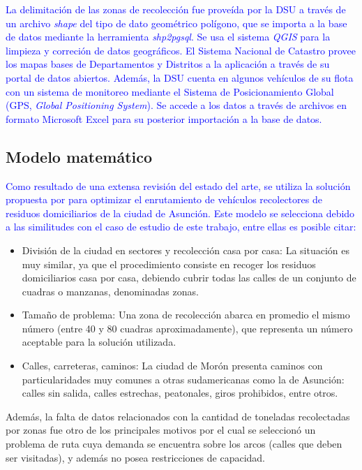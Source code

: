 \documentclass[spanish, conference]{IEEEtran}
\begin{document}
{\textcolor{blue}{La delimitación de las zonas de recolección fue proveída por la DSU a través de un archivo \textit{shape} del tipo de dato geométrico polígono, que se importa a la base de datos mediante la herramienta \textit{shp2pgsql}. Se usa el sistema \textit{QGIS} para la limpieza y correción de datos geográficos. El Sistema Nacional de Catastro provee los mapas bases de Departamentos y Distritos a la aplicación a través de su portal de datos abiertos. Además, la DSU cuenta en  algunos  vehículos  de  su  flota con un sistema de monitoreo mediante el Sistema de Posicionamiento Global (GPS, \textit{Global Positioning System}). Se accede a los datos a través de archivos en formato Microsoft Excel para su posterior importación a la base de datos.}

\subsection{Modelo matemático}

\textcolor{blue}{Como resultado de una extensa revisión del estado del arte, se utiliza la solución propuesta por \cite{Braier2017AnArgentina} para optimizar el enrutamiento de vehículos recolectores de residuos domiciliarios de la ciudad de Asunción. Este modelo se selecciona debido a las similitudes con el caso de estudio de este trabajo, entre ellas es posible citar:}

\begin{itemize}
    \item División de la ciudad en sectores y recolección casa por casa: La situación es muy similar, ya que el procedimiento consiste en recoger los residuos domiciliarios casa por casa, debiendo cubrir todas las calles de un conjunto de cuadras o manzanas, denominadas zonas.
    \item Tamaño de problema: Una zona de recolección abarca en promedio el mismo número (entre 40 y 80 cuadras aproximadamente), que representa un número aceptable para la solución utilizada.
    \item Calles, carreteras, caminos: La ciudad de Morón presenta caminos con particularidades muy comunes a otras sudamericanas como la de Asunción: calles sin salida, calles estrechas, peatonales, giros prohibidos, entre otros.
\end{itemize}

Además, la falta de datos relacionados con la cantidad de toneladas recolectadas por zonas fue otro de los principales motivos por el cual se seleccionó un problema de ruta cuya demanda se encuentra sobre los arcos (calles que deben ser visitadas), y además no posea restricciones de capacidad.

}
\end{document}
